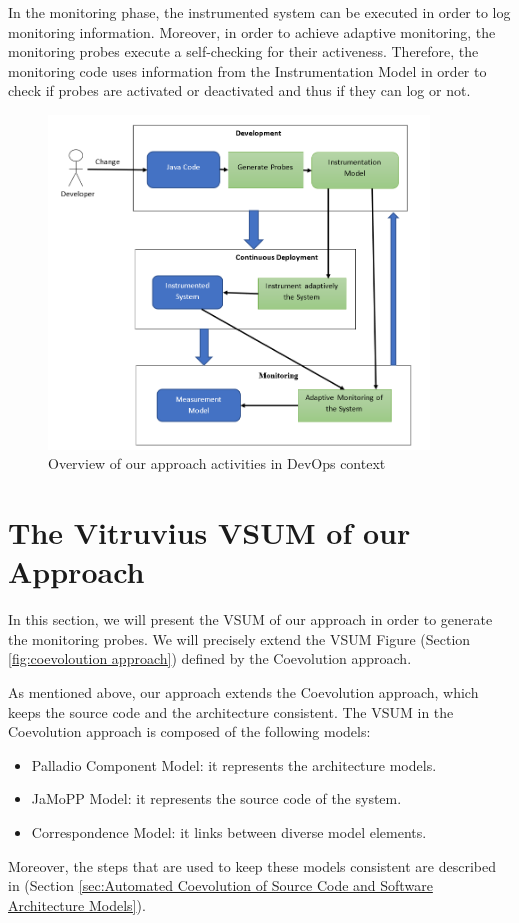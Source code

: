In the monitoring phase, the instrumented system can be executed in order to log monitoring information. Moreover, in order to achieve adaptive monitoring, the monitoring probes execute a self-checking for their activeness. Therefore, the monitoring code uses information from the Instrumentation Model in order to check if probes are activated or deactivated and thus if they can log or not. 


\begin{figure}[h]
\centering
\includegraphics[width=0.9\textwidth]{figures/devops_approach}
\caption{Overview of our approach activities in DevOps context}
\label{fig:devops_approach}
\end{figure}


\section{The Vitruvius VSUM of our Approach}
\label{sec:The Vitruvius VSUM of our approach}

In this section, we will present the VSUM of our approach in order to generate the monitoring probes. We will precisely extend the VSUM Figure (Section \ref{fig:coevoloution approach}) defined by the Coevolution approach.

As mentioned above, our approach extends the Coevolution approach, which keeps the source code and the architecture consistent. The VSUM in the Coevolution approach is composed of the following models:
\begin{itemize}
\item Palladio Component Model: it represents the architecture models.
\item JaMoPP Model: it represents the source code of the system.
\item Correspondence Model: it links between diverse model elements.
\end{itemize}
Moreover, the steps that are used to keep these models consistent are described in (Section \ref{sec:Automated Coevolution of Source Code and Software Architecture Models}). 

